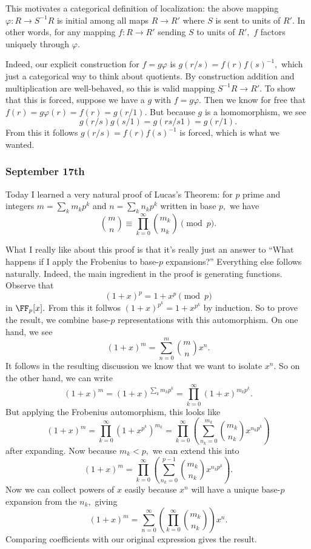 This motivates a categorical definition of localization: the above mapping $\varphi:R\to S^{-1}R$ is initial among all maps $R\to R'$ where $S$ is sent to units of $R'.$ In other words, for any mapping $f:R\to R'$ sending $S$ to units of $R',$ $f$ factors uniquely through $\varphi.$
\begin{center}
\end{center}
Indeed, our explicit construction for $f=g\varphi$ is $g(r/s)=f(r)f(s)^{-1},$ which just a categorical way to think about quotients. By construction addition and multiplication are well-behaved, so this is valid mapping $S^{-1}R\to R'.$ To show that this is forced, suppose we have a $g$ with $f=g\varphi.$ Then we know for free that $f(r)=g\varphi(r)=f(r)=g(r/1).$ But because $g$ is a homomorphism, we see
\[g(r/s)g(s/1)=g(rs/s1)=g(r/1).\]
From this it follows $g(r/s)=f(r)f(s)^{-1}$ is forced, which is what we wanted.

\subsubsection{September 17th}
Today I learned a very natural proof of Lucas's Theorem: for $p$ prime and integers $m=\sum_km_kp^k$ and $n=\sum_kn_kp^k$ written in base $p,$ we have
\[\binom mn\equiv\prod_{k=0}^\infty\binom{m_k}{n_k}\pmod p.\]

What I really like about this proof is that it's really just an answer to ``What happens if I apply the Frobenius to base-$p$ expansions?'' Everything else follows naturally. Indeed, the main ingredient in the proof is generating functions. Observe that
\[(1+x)^p=1+x^p\pmod p\]
in $\FF_p[x].$ From this it follwos $(1+x)^{p^k}=1+x^{p^k}$ by induction. So to prove the result, we combine base-$p$ representations with this automorphism. On one hand, we see
\[(1+x)^m=\sum_{n=0}^m\binom mnx^n.\]
It follows in the resulting discussion we know that we want to isolate $x^n.$ So on the other hand, we can write
\[(1+x)^m=(1+x)^{\sum_km_kp^k}=\prod_{k=0}^\infty(1+x)^{m_kp^k}.\]
But applying the Frobenius automorphism, this looks like
\[(1+x)^m=\prod_{k=0}^\infty\left(1+x^{p^k}\right)^{m_k}=\prod_{k=0}^\infty\left(\sum_{n_k=0}^{m_k}\binom{m_k}{n_k}x^{n_kp^k}\right)\]
after expanding. Now because $m_k<p,$ we can extend this into
\[(1+x)^m=\prod_{k=0}^\infty\left(\sum_{n_k=0}^{p-1}\binom{m_k}{n_k}x^{n_kp^k}\right).\]
Now we can collect powers of $x$ easily because $x^n$ will have a unique base-$p$ expansion from the $n_k,$ giving
\[(1+x)^m=\sum_{n=0}^\infty\left(\prod_{k=0}^\infty\binom{m_k}{n_k}\right)x^n.\]
Comparing coefficients with our original expression gives the result.

